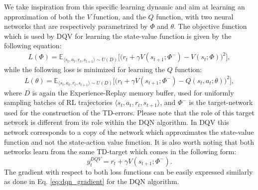 We take inspiration from this specific learning dynamic and aim at learning an approximation of both the $V$ function, and the $Q$ function, with two neural networks that are respectively parametrized by $\Phi$ and $\theta$. The objective function which is used by DQV for learning the state-value function is given by the following equation:
\begin{multline}
L(\Phi) = \mathds{E}_{\langle s_{t},a_{t},r_{t},s_{t+1}\rangle\sim U(D)} \bigg[\big(r_{t} + \gamma V(s_{t+1}; \Phi^{-}) - V(s_{t}; \Phi)\big)^{2}\bigg],
\label{eq:dqv_v_update}
\end{multline}
while the following loss is minimized for learning the $Q$ function:
\begin{multline}
    L(\theta) = \mathds{E}_{\langle s_{t},a_{t},r_{t},s_{t+1}\rangle\sim U(D)} \bigg[\big(r_{t} + \gamma V(s_{t+1}; \Phi^{-}) - Q(s_{t}, a_{t}; \theta)\big)^{2}\bigg],
\label{eq:dqv_q_update}
\end{multline}
where $D$ is again the Experience-Replay memory buffer, used for uniformly sampling batches of RL trajectories $\langle s_{t},a_{t},r_{t},s_{t+1}\rangle$, and $\Phi^{-}$ is the target-network used for the construction of the TD-errors. Please note that the role of this target network is different from its role within the DQN algorithm. In DQV this network corresponds to a copy of the network which approximates the state-value function and not the state-action value function. It is also worth noting that both networks learn from the same TD-target which comes in the following form:
\begin{equation}
y_{t}^{DQV} = r_{t} + \gamma V(s_{t+1}; \Phi^{-}). 
\end{equation}
The gradient with respect to both loss functions can be easily expressed similarly as done in Eq. \ref{eq:dqn_gradient} for the DQN algorithm.



